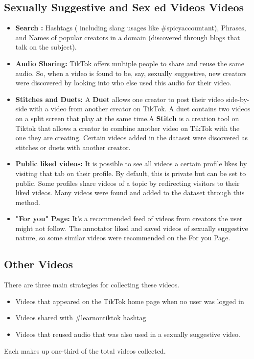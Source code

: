 \documentclass[11pt]{article}
\begin{document}
\label{appendix:a}
\subsection{Sexually Suggestive and Sex ed Videos Videos }
\begin{itemize}
\item \textbf{Search :} Hashtags ( including slang usages like \#spicyaccountant), Phrases, and Names of popular creators in a domain (discovered through blogs that talk on the subject).
\item \textbf{Audio Sharing:} TikTok offers multiple people to share and reuse the same audio. So, when a video is found to be, say, sexually suggestive, new creators were discovered by looking into who else used this audio for their video.
\item \textbf{Stitches and Duets:} A \textbf{Duet} allows one creator to post their video side-by-side with a video from another creator on TikTok. A duet contains two videos on a split screen that play at the same time.A \textbf{Stitch} is a creation tool on Tiktok that allows a creator to combine another video on TikTok with the one they are creating. Certain videos added in the dataset were discovered as stitches or duets with another creator.
\item \textbf{Public liked videos:} It is possible to see all videos a certain profile likes by visiting that tab on their profile. By default, this is private but can be set to public. Some profiles share videos of a topic by redirecting visitors to their liked videos. Many videos were found and added to the dataset through this method.
\item \textbf{"For you" Page:} It's a recommended feed of videos from creators the user might not follow. The annotator liked and saved videos of sexually suggestive nature, so some similar videos were recommended on the For you Page.
\end{itemize}

\subsection{Other Videos}
There are three main strategies for collecting these videos. 
\begin{itemize}
    \item Videos that appeared on the TikTok home page when no user was logged in
    \item Videos shared with \#learnontiktok hashtag
    \item Videos that reused audio that was also used in a sexually suggestive video.
\end{itemize}
Each makes up one-third of the total videos collected.
\end{document}

